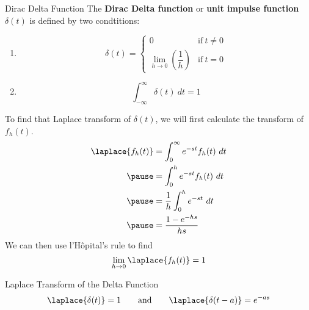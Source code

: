 \documentclass{beamer}
\begin{document}
\begin{frame}
\begin{block}{Dirac Delta Function}
The \textbf{Dirac Delta function} or \textbf{unit impulse function} $\delta(t)$ is defined by two condtitions:
\begin{enumerate}
\item \begin{equation*}
\delta(t)=
\begin{cases}
0 & \text{if}~ t\neq 0 \\
\lim_{h\rightarrow 0}\left(\dfrac{1}{h}\right) & \text{if}~t=0
\end{cases}
\end{equation*}
\item \begin{equation*}
\int_{-\infty}^{\infty} \delta(t)~dt=1
\end{equation*}
\end{enumerate}
\end{block}
\end{frame}

\begin{frame}
\begin{block}{}
To find that Laplace transform of $\delta(t)$, we will first calculate the transform of $f_h(t)$.
\begin{equation*}
\begin{aligned}
\laplace\{f_h(t)\}
&= \int_0^\infty e^{-st}f_h(t)~dt \\\pause
&= \int_0^h e^{-st}f_h(t)~dt \\\pause
&=\dfrac{1}{h} \int_0^h e^{-st}~dt \\\pause
&=\dfrac{1-e^{-hs}}{hs}
\end{aligned}
\end{equation*}\pause
We can then use l'H\^opital's rule to find
\begin{equation*}
\lim_{h\rightarrow 0}\laplace\{f_h(t)\}=1
\end{equation*}
\end{block}\pause
\begin{block}{Laplace Transform of the Delta Function}
\begin{equation*}
\laplace\{\delta(t)\}=1
\qquad\text{and}\qquad
\laplace\{\delta(t-a)\}=e^{-as}
\end{equation*}
\end{block}
\end{frame}
\end{document}
